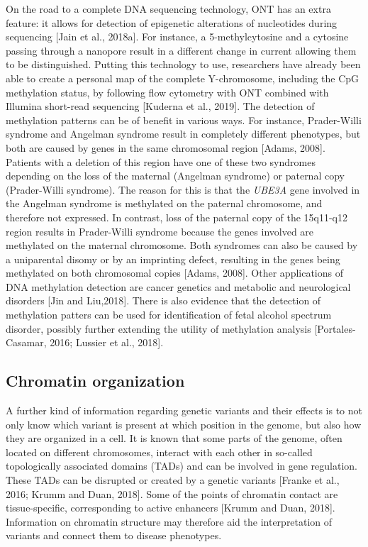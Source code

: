 {On the road to a complete DNA sequencing technology, ONT has an extra feature: it allows for detection of epigenetic alterations of nucleotides during sequencing [Jain et al., 2018a]. 
For instance, a 5-methylcytosine and a cytosine passing through a nanopore result in a different change in current allowing them to be distinguished. Putting this technology to use, researchers have already
been able to create a personal map of the complete Y-chromosome, including the CpG methylation status, by following flow cytometry with ONT combined with Illumina short-read sequencing [Kuderna et al., 2019]. 
The detection of methylation patterns can be of benefit in various ways. 
For instance, Prader-Willi syndrome and Angelman syndrome result in completely different phenotypes, but both are caused by genes in the same chromosomal region [Adams, 2008]. 
Patients with a deletion of this region have one of these two syndromes depending on the loss of the maternal (Angelman syndrome) or paternal copy (Prader-Willi syndrome). 
The reason for this is that the \textsl{UBE3A} gene involved in the Angelman syndrome is methylated on the paternal chromosome, and therefore not expressed. In contrast, loss of the paternal copy of the 15q11-q12 region results in Prader-Willi syndrome because the genes involved are methylated on the maternal chromosome.
Both syndromes can also be caused by a uniparental disomy or by an imprinting defect, resulting in the genes being methylated on both chromosomal copies [Adams, 2008]. 
Other applications of DNA methylation detection are cancer genetics and metabolic and neurological disorders [Jin and Liu,2018]. 
There is also evidence that the detection of methylation patters can be used for identification of fetal alcohol spectrum disorder, possibly further extending the utility of methylation analysis [Portales-Casamar, 2016; Lussier et al., 2018]. 

\subsection{Chromatin organization}
A further kind of information regarding genetic variants and their effects is to not only know which variant is present at which position in the genome, but also how they are organized in a cell. 
It is known that some parts of the genome, often located on different chromosomes, interact with each other in so-called topologically associated domains (TADs) and can be involved in gene regulation.
These TADs can be disrupted or created by a genetic variants [Franke et al., 2016; Krumm and Duan, 2018]. 
Some of the points of chromatin contact are tissue-specific, corresponding to active enhancers [Krumm and Duan, 2018]. Information on chromatin structure may therefore aid the interpretation
of variants and connect them to disease phenotypes.

}
